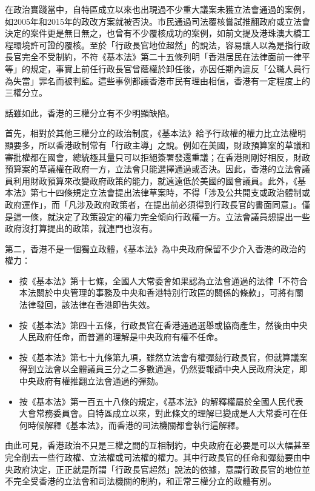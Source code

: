 在政治實踐當中，自特區成立以來也出現過不少重大議案未獲立法會通過的案例，如2005年和2015年的政改方案就被否決。市民通過司法覆核嘗試推翻政府或立法會決定的案件更是無日無之，也曾有不少覆核成功的案例，如前文提及港珠澳大橋工程環境許可證的覆核。至於「行政長官地位超然」的說法，容易讓人以為是指行政長官完全不受制約，不符《基本法》第二十五條列明「香港居民在法律面前一律平等」的規定，事實上前任行政長官曾蔭權於卸任後，亦因任期內違反「公職人員行為失當」罪名而被判監。這些事例都讓香港市民有理由相信，香港有一定程度上的三權分立。

話雖如此，香港的三權分立有不少明顯缺陷。

首先，相對於其他三權分立的政治制度，《基本法》給予行政權的權力比立法權明顯要多，所以香港政制常有「行政主導」之說。例如在美國，財政預算案的草議和審批權都在國會，總統極其量只可以拒絕簽署發還重議；在香港則剛好相反，財政預算案的草議權在政府一方，立法會只能選擇通過或否決。因此，香港的立法會議員利用財政預算來改變政府政策的能力，就遠遠低於美國的國會議員。此外，《基本法》第七十四條規定立法會提出法律草案時，不得「涉及公共開支或政治體制或政府運作」，而「凡涉及政府政策者，在提出前必須得到行政長官的書面同意」。僅是這一條，就決定了政策設定的權力完全傾向行政權一方。立法會議員想提出一些政府沒打算提出的政策，就連門也沒有。

第二，香港不是一個獨立政體，《基本法》為中央政府保留不少介入香港的政治的權力：

\begin{itemize}
    \item 按《基本法》第十七條，全國人大常委會如果認為立法會通過的法律「不符合本法關於中央管理的事務及中央和香港特別行政區的關係的條款」，可將有關法律發回，該法律在香港即告失效。
    \item 按《基本法》第四十五條，行政長官在香港通過選舉或協商產生，然後由中央人民政府任命，而普遍的理解是中央政府有權不任命。
    \item 按《基本法》第七十九條第九項，雖然立法會有權彈劾行政長官，但就算議案得到立法會以全體議員三分之二多數通過，仍然要報請中央人民政府決定，即中央政府有權推翻立法會通過的彈劾。
    \item 按《基本法》第一百五十八條的規定，《基本法》的解釋權屬於全國人民代表大會常務委員會。自特區成立以來，對此條文的理解已變成是人大常委可在任何時候解釋《基本法》，而香港的司法機關都會執行這解釋。
\end{itemize}

由此可見，香港政治不只是三權之間的互相制約，中央政府在必要是可以大幅甚至完全削去一些行政權、立法權或司法權的權力。其中行政長官的任命和彈劾要由中央政府決定，正正就是所謂「行政長官超然」說法的依據，意謂行政長官的地位並不完全受香港的立法會和司法機關的制約，和正常三權分立的政體有別。

